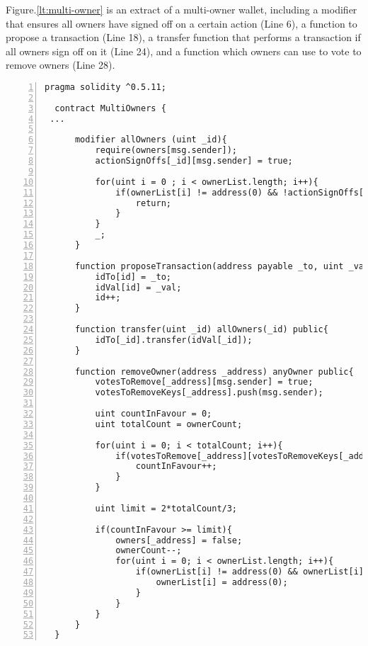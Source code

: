 \documentclass{article}
\begin{document}
Figure.\ref{lt:multi-owner} is an extract of a multi-owner wallet, including a modifier that ensures all owners have signed off on a certain action (Line 6), a function to propose a transaction (Line 18), a transfer function that performs a transaction if all owners sign off on it (Line 24), and a function which owners can use to vote to remove owners (Line 28).

  \small\begin{lstlisting}[language=DEA,basicstyle=\scriptsize,numbers=left,numbersep=2pt,xleftmargin=0.3cm,escapechar=\%,label={lt:multi-owner}]
  pragma solidity ^0.5.11;
  
  contract MultiOwners {
 ...
 
      modifier allOwners (uint _id){
          require(owners[msg.sender]);
          actionSignOffs[_id][msg.sender] = true;
  
          for(uint i = 0 ; i < ownerList.length; i++){
              if(ownerList[i] != address(0) && !actionSignOffs[_id][ownerList[i]]){
                  return;
              }
          }
          _;
      }

      function proposeTransaction(address payable _to, uint _val) public anyOwner{
          idTo[id] = _to;
          idVal[id] = _val;
          id++;
      }
  
      function transfer(uint _id) allOwners(_id) public{
          idTo[_id].transfer(idVal[_id]);
      }
      
      function removeOwner(address _address) anyOwner public{
          votesToRemove[_address][msg.sender] = true;
          votesToRemoveKeys[_address].push(msg.sender);
  
          uint countInFavour = 0;
          uint totalCount = ownerCount;
  
          for(uint i = 0; i < totalCount; i++){
              if(votesToRemove[_address][votesToRemoveKeys[_address][i]]){
                  countInFavour++;
              }
          }
  
          uint limit = 2*totalCount/3;
  
          if(countInFavour >= limit){
              owners[_address] = false;
              ownerCount--;
              for(uint i = 0; i < ownerList.length; i++){
                  if(ownerList[i] != address(0) && ownerList[i] == _address){
                      ownerList[i] = address(0);
                  }
              }
          }
      }    
  }
 \end{lstlisting}\normalsize
\end{document}
